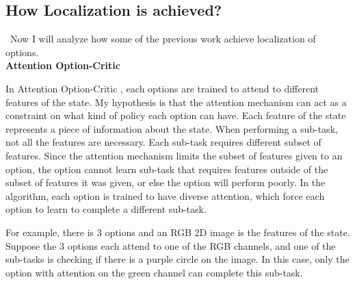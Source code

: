 \documentclass{article}
\begin{document}
	\subsection*{How Localization is achieved?}
	\qquad \ Now I will analyze how some of the previous work achieve localization of options.\vspace{0.15in}\\
	\large{\bfseries{Attention Option-Critic}}\vspace{0.05in}
	
	\normalsize{\quad In Attention Option-Critic \cite{attentionoptioncritic}, each options are trained to attend to different features of the state. My hypothesis is that the attention mechanism can act as a constraint on what kind of policy each option can have. Each feature of the state represents a piece of information about the state. When performing a sub-task, not all the features are necessary. Each sub-task requires different subset of features. Since the attention mechanism limits the subset of features given to an option, the option cannot learn sub-task that requires features outside of the subset of features it was given, or else the option will perform poorly. In the algorithm, each option is trained to have diverse attention, which force each option to learn to complete a different sub-task.
		
	\quad For example, there is 3 options and an RGB 2D image is the features of the state. Suppose the 3 options each attend to one of the RGB channels, and one of the sub-tasks is checking if there is a purple circle on the image. In this case, only the option with attention on the green channel can complete this sub-task.}
\end{document}
